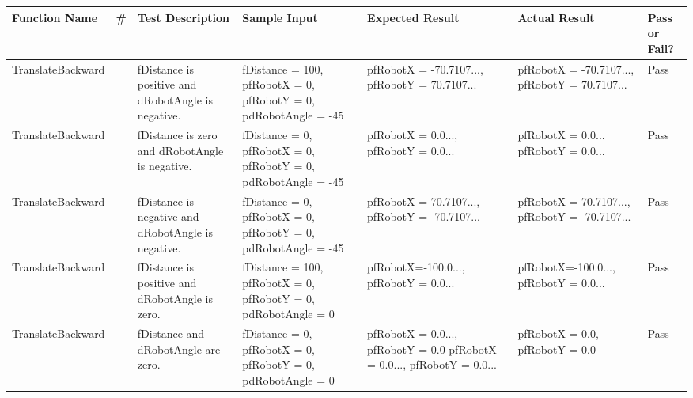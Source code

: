 \documentclass[10pt, letterpaper]{article}
\begin{document}
\begin{table}[h]
    \centering
    \renewcommand{\arraystretch}{1.5}
    \begin{tabularx}{\textwidth}{
            |>{\raggedright\arraybackslash}p{3cm}
            |>{\raggedright\arraybackslash}p{0.20cm}
            |>{\raggedright\arraybackslash}p{2.5cm}
            |>{\raggedright\arraybackslash}X
            |>{\raggedright\arraybackslash}p{3cm}
            |>{\raggedright\arraybackslash}p{3cm}
            |>{\raggedright\arraybackslash}p{1cm}|
        }
        \hline

        \textbf{Function Name} &
        \textbf{\#} &
        \textbf{Test Description} &
        \textbf{Sample Input} &
        \textbf{Expected Result} &
        \textbf{Actual Result} &
        \textbf{Pass or Fail?} \\ 
        \hline

        TranslateBackward &
        4 &
        fDistance is positive and dRobotAngle is negative. &
        fDistance = 100, pfRobotX = 0, pfRobotY = 0, pdRobotAngle = -45 &
        pfRobotX = -70.7107..., pfRobotY = 70.7107... &
        pfRobotX = -70.7107..., pfRobotY = 70.7107... &
        Pass \\
        \hline

        TranslateBackward &
        5 &
        fDistance is zero and dRobotAngle is negative. &
        fDistance = 0, pfRobotX = 0, pfRobotY = 0, pdRobotAngle = -45 &
        pfRobotX = 0.0..., pfRobotY = 0.0... &
        pfRobotX = 0.0... pfRobotY = 0.0... &
        Pass \\
        \hline

        TranslateBackward &
        6 &
        fDistance is negative and dRobotAngle is negative. &
        fDistance = 0, pfRobotX = 0, pfRobotY = 0, pdRobotAngle = -45 &
        pfRobotX = 70.7107..., pfRobotY = -70.7107... &
        pfRobotX = 70.7107..., pfRobotY = -70.7107... &
        Pass \\
        \hline

        TranslateBackward &
        7 &
        fDistance is positive and dRobotAngle is zero. &
        fDistance = 100, pfRobotX = 0, pfRobotY = 0, pdRobotAngle = 0 &
        pfRobotX=-100.0..., pfRobotY = 0.0... &
        pfRobotX=-100.0..., pfRobotY = 0.0... &
        Pass \\
        \hline

        TranslateBackward &
        8 &
        fDistance and dRobotAngle are zero. &
        fDistance = 0, pfRobotX = 0, pfRobotY = 0, pdRobotAngle = 0 &
        pfRobotX = 0.0..., pfRobotY = 0.0
        pfRobotX = 0.0..., pfRobotY = 0.0... &
        pfRobotX = 0.0, pfRobotY = 0.0 &
        Pass \\
        \hline


\end{tabularx}
\end{table}
\end{document}
